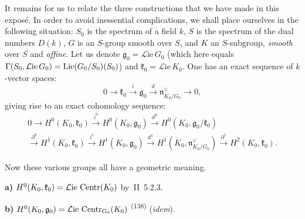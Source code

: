 \label{III.4.38}
It remains for us to relate the three constructions that we have made in
this exposé. In order to avoid inessential complications, we shall place
ourselves in the following situation: \(S_0\) is the spectrum of a field
\(k\), \(S\) is the spectrum of the dual numbers \(D(k)\), \(G\) is an
\(S\)-group smooth over \(S\), and \(K\) an \(S\)-subgroup, \emph{smooth}
over \(S\) and \emph{affine}.
{\renewcommand{\thefootnote}{(136)}}
Let us denote \(\mathfrak{g}_0=\mathcal{L}\mathrm{ie}\,G_0\) (which here
equals \(\Gamma(S_0,\mathcal{L}\mathrm{ie}\,G_0)
=\operatorname{Lie}(G_0/S_0)(S_0)\)) and \(\mathfrak{k}_0=\mathcal{L}\mathrm{ie}\,K_0\).
One has an exact sequence of \(k\)-vector
spaces{\renewcommand{\thefootnote}{(137)}}:
\[
0\longrightarrow\mathfrak{k}_0\xrightarrow{i}\mathfrak{g}_0
\xrightarrow{d}\mathfrak{n}^{\vee}_{K_0/G_0}\longrightarrow 0,
\]
giving rise to an exact cohomology sequence:
\begin{multline*}
0\longrightarrow H^{0}(K_0,\mathfrak{k}_0)
\xrightarrow{i^{0}}H^{0}(K_0,\mathfrak{g}_0)
\xrightarrow{d^{0}}H^{0}(K_0,\mathfrak{g}_0/\mathfrak{k}_0)\\
\xrightarrow{\partial^{0}}H^{1}(K_0,\mathfrak{k}_0)
\xrightarrow{i^{1}}H^{1}(K_0,\mathfrak{g}_0)
\xrightarrow{d^{1}}H^{1}(K_0,\mathfrak{n}^{\vee}_{K_0/G_0})
\xrightarrow{\partial^{1}}H^{2}(K_0,\mathfrak{k}_0).
\end{multline*}

Now these various groups all have a geometric meaning.

\noindent\textbf{a)}
\(H^{0}(K_0,\mathfrak{k}_0)
=\mathcal{L}\mathrm{ie}\,\operatorname{Centr}(K_0)\)%
{\renewcommand{\thefootnote}{(138)}}
by~II~5.2.3.

\noindent\textbf{b)}
\(H^{0}(K_0,\mathfrak{g}_0)
=\mathcal{L}\mathrm{ie}\,\operatorname{Centr}_{G_0}(K_0)\)%
\textsuperscript{(138)}
(\emph{idem}).

